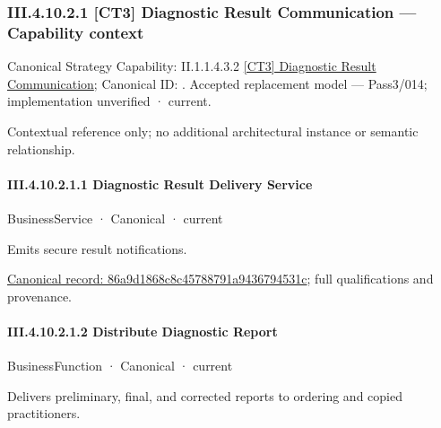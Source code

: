 \subsubsection*{III.4.10.2.1 [CT3] Diagnostic Result Communication — Capability context}
\label{navigation:III.4.10.2.1}

{\small Canonical Strategy Capability: II.1.1.4.3.2 \hyperref[element:1eb70d951f164ed8a0b75ce1704b9083]{[CT3] Diagnostic Result Communication}; Canonical ID: \texttt{}. Accepted replacement model — Pass3/014; implementation unverified · current.}\par
Contextual reference only; no additional architectural instance or semantic relationship.\par
\paragraph*{III.4.10.2.1.1 Diagnostic Result Delivery Service}
\label{navigation:III.4.10.2.1.1}

\label{element:86a9d1868c8c45788791a9436794531c}
{\small BusinessService · Canonical · current}\par

Emits secure result notifications.


{\footnotesize \href{../../../../../../../../continuum/business/business-service/86a9d1868c8c45788791a9436794531c.md}{Canonical record: 86a9d1868c8c45788791a9436794531c}; full qualifications and provenance.}\par
\paragraph*{III.4.10.2.1.2 Distribute Diagnostic Report}
\label{navigation:III.4.10.2.1.2}

\label{element:ab6d94a9e06742aabe087f11d93f4334}
{\small BusinessFunction · Canonical · current}\par

Delivers preliminary, final, and corrected reports to ordering and copied practitioners.


